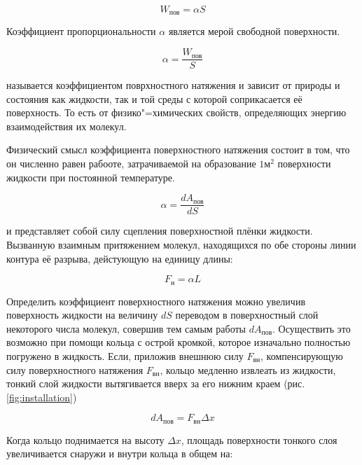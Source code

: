 \begin{equation*}
    W_\text{пов} = \alpha S
\end{equation*}

Коэффициент пропорциональности \texttt{$\alpha$} является мерой свободной поверхности.

\begin{equation*}
    \alpha = \frac{W_\text{пов}}{S}
\end{equation*}

называется коэффициентом поврхностного натяжения и зависит от природы и состояния как жидкости, так и той среды с которой соприкасается её поверхность. То есть от физико"=химических свойств, определяющих энергию взаимодействия их молекул.

Физический смысл коэффициента поверхностного натяжения состоит в том, что он численно равен рабооте, затрачиваемой на образование $1 \text{м}^2$ поверхности жидкости при постоянной температуре.

\begin{equation*}
    \alpha = \frac{d A_\text{пов}}{d S}
\end{equation*}

и представляет собой силу сцепления поверхностной плёнки жидкости. Вызванную взаимным притяжением молекул, находящихся по обе стороны линии контура её разрыва, дейстующую на единицу длины:

\begin{equation*}
    F_\text{н} = \alpha L
\end{equation*}

Определить коэффициент поверхностного натяжения можно увеличив поверхность жидкости на величину \texttt{$d S$} переводом в поверхностный слой некоторого числа молекул, совершив тем самым работы \texttt{$d A_\text{пов}$}. Осуществить это возможно при помощи кольца с острой кромкой, которое изначально полностью погружено в жидкость. Если, приложив внешнюю силу \texttt{$F_\text{вн}$}, компенсирующую силу поверхностного натяжения \texttt{$F_\text{вн}$}, кольцо медленно извлеать из жидкости, тонкий слой жидкости вытягивается вверх за его нижним краем (рис. \ref{fig:installation})

\begin{equation*}
    d A_\text{пов} = F_\text{вн} \Delta x
\end{equation*}

Когда кольцо поднимается на высоту \texttt{$\Delta x$}, площадь поверхности тонкого слоя увеличивается снаружи и внутри кольца в общем на:

